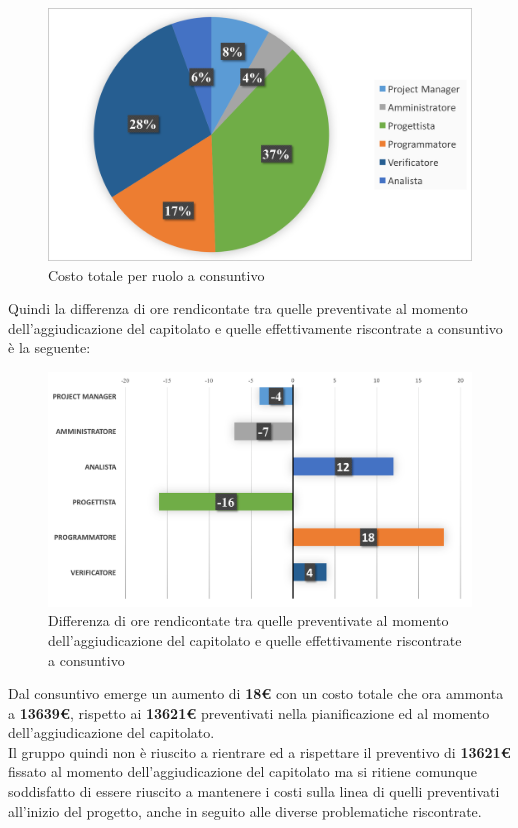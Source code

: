 \begin{figure}[H]
	\centering 
	\includegraphics[scale=0.7]{Immagini/GraficiCONS/DIFFCONS.png}
	\caption{Costo totale per ruolo a consuntivo}
\end{figure}

\newpage
Quindi la differenza di ore rendicontate tra quelle preventivate al momento dell'aggiudicazione del capitolato e quelle effettivamente riscontrate a consuntivo è la seguente:

\begin{figure}[H]
	\centering 
	\includegraphics[scale=0.7]{Immagini/GraficiCONS/DIFFORARIA.png}
	\caption{Differenza di ore rendicontate tra quelle preventivate al momento dell'aggiudicazione del capitolato e quelle effettivamente riscontrate a consuntivo}
\end{figure}

Dal consuntivo emerge un aumento di \textbf{18\euro} con un costo totale che ora ammonta a \textbf{13639\euro}, rispetto ai \textbf{13621\euro} preventivati nella pianificazione ed al momento dell'aggiudicazione del capitolato.\\
Il gruppo quindi non è riuscito a rientrare ed a rispettare il preventivo di \textbf{13621\euro} fissato al momento dell'aggiudicazione del capitolato ma si ritiene comunque soddisfatto di essere riuscito a mantenere i costi sulla linea di quelli preventivati all'inizio del progetto, anche in seguito alle diverse problematiche riscontrate.